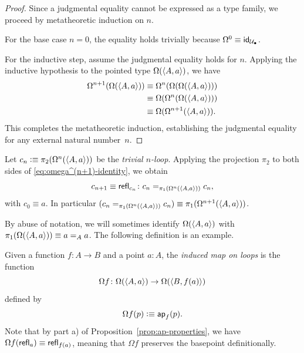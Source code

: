 \begin{proof}
    Since a judgmental equality cannot be expressed as a type family, we proceed by metatheoretic induction on\/ $n$.
 
     For the base case\/ $n=0$, the equality holds trivially because\/ $\Omega^0\equiv\id_{\puniv}$.
     
     For the inductive step, assume the judgmental equality holds for\/ $n$. Applying the inductive hypothesis to the pointed type\/ $\Omega(\langle A,a\rangle)$, we have
    \begin{align*}
        \Omega^{n+1}(\Omega(\langle A,a\rangle))
            &\equiv\Omega^n(\Omega(\Omega(\langle A,a\rangle)))\\
            &\equiv\Omega(\Omega^n(\Omega(\langle A,a\rangle)))\\
            &\equiv\Omega(\Omega^{n+1}(\langle A,a\rangle)).
    \end{align*}
    This completes the metatheoretic induction, establishing the judgmental equality for any external natural number~$n$.
    
\end{proof}

\begin{rem}\label{rem:trivial-n-loop}
    Let $c_n\mathrel{\vcentcolon}\equiv\pi_2(\Omega^n(\langle A,a\rangle))$ be the \textsl{trivial $n$-loop}. Applying the projection $\pi_2$ to both sides of \eqref{eq:omega^(n+1)-identity}, we obtain
    \[
        c_{n+1}\equiv\fun{refl}_{c_n}
            \colon c_n\eq{\pi_1(\Omega^n(\dep{A,a}))}c_n,
    \]
    with $c_0\equiv a$. In particular $(c_n\mathrel{=_{\pi_1(\Omega^n(\langle A,a\rangle))}}c_n)\equiv\pi_1(\Omega^{n+1}(\langle A,a\rangle))$.
\end{rem}

\begin{ntn}\label{ntn:loop-space}
    By abuse of notation, we will sometimes identify $\Omega(\langle A,a\rangle)$ with $\pi_1(\Omega(\langle A,a\rangle))\equiv a\mathrel{=_{A}}a$. The following definition is an example.
\end{ntn}

\begin{defn}
    Given a function $f\colon A\to B$ and a point $a\colon A$, the \textsl{induced map on loops} is the function
    \[
        \Omega f\colon\Omega(\dep{A,a})\to\Omega(\dep{B,f(a)})
    \]
    defined by
    \[
        \Omega f(p)\mathrel{\vcentcolon}\equiv\mathsf{ap}_f(p).
    \]
    Note that by part a) of Proposition~\ref{prop:ap-properties}, we have $\Omega f(\mathsf{refl}_a) \equiv \mathsf{refl}_{f(a)}$, meaning that $\Omega f$ preserves the basepoint definitionally.
\end{defn}

